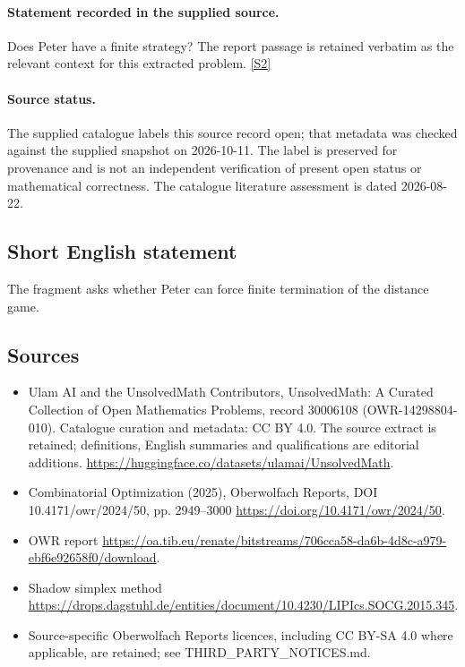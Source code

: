 \documentclass[11pt]{article}
\newcommand{\sref}[2]{\hyperlink{source:#1:#2}{[S#2]}}
\begin{document}
\paragraph{Statement recorded in the supplied source.}
Does Peter have a ﬁnite strategy? The report passage is retained verbatim as the relevant context for this extracted problem. \sref{30006108}{2}
\paragraph{Source status.}
The supplied catalogue labels this source record open; that metadata was checked against the supplied snapshot on 2026-10-11. The label is preserved for provenance and is not an independent verification of present open status or mathematical correctness. The catalogue literature assessment is dated 2026-08-22.
\subsection{Short English statement}
The fragment asks whether Peter can force finite termination of the distance game.
\subsection{Sources}
\begin{itemize}
\item[\hypertarget{source:30006108:1}{S1}] Ulam AI and the UnsolvedMath Contributors, UnsolvedMath: A Curated Collection of Open Mathematics Problems, record 30006108 (OWR-14298804-010). Catalogue curation and metadata: CC BY 4.0. The source extract is retained; definitions, English summaries and qualifications are editorial additions.
\url{https://huggingface.co/datasets/ulamai/UnsolvedMath}.
\item[\hypertarget{source:30006108:2}{S2}] Combinatorial Optimization (2025), Oberwolfach Reports, DOI 10.4171/owr/2024/50, pp. 2949--3000
\url{https://doi.org/10.4171/owr/2024/50}.
\item[\hypertarget{source:30006108:3}{S3}] OWR report
\url{https://oa.tib.eu/renate/bitstreams/706cca58-da6b-4d8c-a979-ebf6e92658f0/download}.
\item[\hypertarget{source:30006108:4}{S4}] Shadow simplex method
\url{https://drops.dagstuhl.de/entities/document/10.4230/LIPIcs.SOCG.2015.345}.
\item Source-specific Oberwolfach Reports licences, including CC BY-SA 4.0 where applicable, are retained; see THIRD\_PARTY\_NOTICES.md.
\end{itemize}
\end{document}
